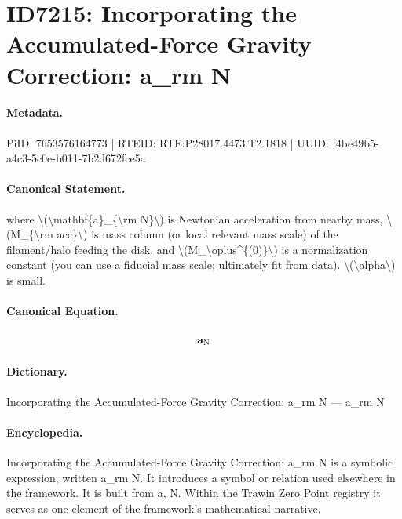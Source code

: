 \section*{ID7215: Incorporating the Accumulated-Force Gravity Correction: a\_rm N}
\paragraph{Metadata.}
PiID: 7653576164773 | RTEID: RTE:P28017.4473:T2.1818 | UUID: f4be49b5-a4c3-5c0e-b011-7b2d672fce5a

\paragraph{Canonical Statement.}
where \textbackslash{}(\textbackslash{}mathbf\{a\}\_\{\textbackslash{}rm N\}\textbackslash{}) is Newtonian acceleration from nearby mass, \textbackslash{}(M\_\{\textbackslash{}rm acc\}\textbackslash{}) is mass column (or local relevant mass scale) of the filament/halo feeding the disk, and \textbackslash{}(M\_\textbackslash{}oplus\textasciicircum{}\{(0)\}\textbackslash{}) is a normalization constant (you can use a fiducial mass scale; ultimately fit from data). \textbackslash{}(\textbackslash{}alpha\textbackslash{}) is small.

\paragraph{Canonical Equation.}
\[
\mathbf{a}_{\rm N}
\]

\paragraph{Dictionary.}
Incorporating the Accumulated-Force Gravity Correction: a\_rm N — a\_rm N

\paragraph{Encyclopedia.}
Incorporating the Accumulated-Force Gravity Correction: a\_rm N is a symbolic expression, written a\_rm N. It introduces a symbol or relation used elsewhere in the framework. It is built from a, N. Within the Trawin Zero Point registry it serves as one element of the framework's mathematical narrative.
